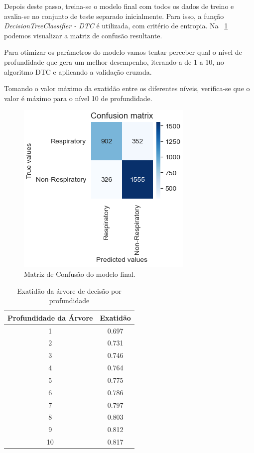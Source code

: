 \documentclass[conference]{IEEEtran}
\begin{document}
Depois deste passo, treina-se o modelo final com todos os dados de treino e avalia-se no conjunto de teste separado inicialmente. Para isso, a função \textit{DecisionTreeClassifier - DTC} é utilizada, com critério de entropia. Na \figurename~\ref{fig:arvoreDecisaoCM} podemos visualizar a matriz de confusão resultante.

Para otimizar os parâmetros do modelo vamos tentar perceber qual o nível de profundidade que gera um melhor desempenho, iterando-a de 1 a 10, no algoritmo DTC e aplicando a validação cruzada.

Tomando o valor máximo da exatidão entre os diferentes níveis, verifica-se que o valor é máximo para o nível 10 de profundidade.

\begin{figure}[h]
	\centering
	\includegraphics[width=0.8\linewidth]{arvoreDecisaoCM}
	\caption{Matriz de Confusão do modelo final.}
	\label{fig:arvoreDecisaoCM}
\end{figure}


\begin{table}[ht]
	\centering
	\caption{Exatidão da árvore de decisão por profundidade}
	\begin{tabular}{|c|c|}
		\hline
		\textbf{Profundidade da Árvore} & \textbf{Exatidão} \\
		\hline
		1  & 0.697 \\
		2  & 0.731 \\
		3  & 0.746 \\
		4  & 0.764 \\
		5  & 0.775 \\
		6  & 0.786 \\
		7  & 0.797 \\
		8  & 0.803 \\
		9  & 0.812 \\
		10 & 0.817 \\
		\hline
	\end{tabular}
	\label{tab:acc_tree_depth}
\end{table}
\end{document}
